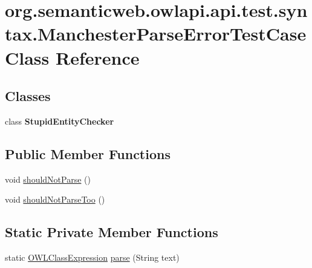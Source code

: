 \hypertarget{classorg_1_1semanticweb_1_1owlapi_1_1api_1_1test_1_1syntax_1_1_manchester_parse_error_test_case}{\section{org.\-semanticweb.\-owlapi.\-api.\-test.\-syntax.\-Manchester\-Parse\-Error\-Test\-Case Class Reference}
\label{classorg_1_1semanticweb_1_1owlapi_1_1api_1_1test_1_1syntax_1_1_manchester_parse_error_test_case}
}
\subsection*{Classes}
\begin{DoxyCompactItemize}
\item 
class {\bfseries Stupid\-Entity\-Checker}
\end{DoxyCompactItemize}
\subsection*{Public Member Functions}
\begin{DoxyCompactItemize}
\item 
void \hyperlink{classorg_1_1semanticweb_1_1owlapi_1_1api_1_1test_1_1syntax_1_1_manchester_parse_error_test_case_a0c0497fa2006628ec451c0522d6ee04c}{should\-Not\-Parse} ()
\item 
void \hyperlink{classorg_1_1semanticweb_1_1owlapi_1_1api_1_1test_1_1syntax_1_1_manchester_parse_error_test_case_a27ba73f3cec78607201ebdf2fea1876b}{should\-Not\-Parse\-Too} ()
\end{DoxyCompactItemize}
\subsection*{Static Private Member Functions}
\begin{DoxyCompactItemize}
\item 
static \hyperlink{interfaceorg_1_1semanticweb_1_1owlapi_1_1model_1_1_o_w_l_class_expression}{O\-W\-L\-Class\-Expression} \hyperlink{classorg_1_1semanticweb_1_1owlapi_1_1api_1_1test_1_1syntax_1_1_manchester_parse_error_test_case_af426928eb488e863e8dca2f09b80e1e7}{parse} (String text)
\end{DoxyCompactItemize}


